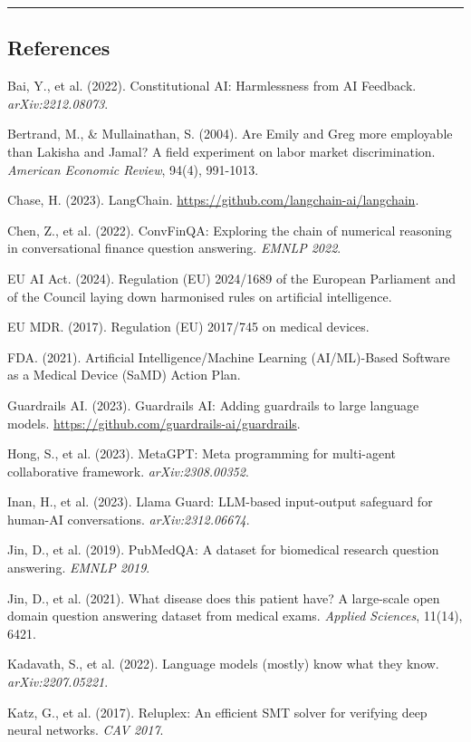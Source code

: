 \documentclass[
]{article}
\begin{document}
\begin{center}\rule{0.5\linewidth}{0.5pt}\end{center}

\hypertarget{references}{%
\subsection{References}\label{references}}

Bai, Y., et al. (2022). Constitutional AI: Harmlessness from AI Feedback. \emph{arXiv:2212.08073}.

Bertrand, M., \& Mullainathan, S. (2004). Are Emily and Greg more employable than Lakisha and Jamal? A field experiment on labor market discrimination. \emph{American Economic Review}, 94(4), 991-1013.

Chase, H. (2023). LangChain. \url{https://github.com/langchain-ai/langchain}.

Chen, Z., et al. (2022). ConvFinQA: Exploring the chain of numerical reasoning in conversational finance question answering. \emph{EMNLP 2022}.

EU AI Act. (2024). Regulation (EU) 2024/1689 of the European Parliament and of the Council laying down harmonised rules on artificial intelligence.

EU MDR. (2017). Regulation (EU) 2017/745 on medical devices.

FDA. (2021). Artificial Intelligence/Machine Learning (AI/ML)-Based Software as a Medical Device (SaMD) Action Plan.

Guardrails AI. (2023). Guardrails AI: Adding guardrails to large language models. \url{https://github.com/guardrails-ai/guardrails}.

Hong, S., et al. (2023). MetaGPT: Meta programming for multi-agent collaborative framework. \emph{arXiv:2308.00352}.

Inan, H., et al. (2023). Llama Guard: LLM-based input-output safeguard for human-AI conversations. \emph{arXiv:2312.06674}.

Jin, D., et al. (2019). PubMedQA: A dataset for biomedical research question answering. \emph{EMNLP 2019}.

Jin, D., et al. (2021). What disease does this patient have? A large-scale open domain question answering dataset from medical exams. \emph{Applied Sciences}, 11(14), 6421.

Kadavath, S., et al. (2022). Language models (mostly) know what they know. \emph{arXiv:2207.05221}.

Katz, G., et al. (2017). Reluplex: An efficient SMT solver for verifying deep neural networks. \emph{CAV 2017}.
\end{document}
